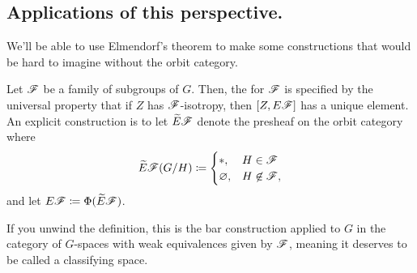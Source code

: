 \subsection*{Applications of this perspective.}
We'll be able to use Elmendorf's theorem to make some constructions that would be hard to imagine without the orbit
category.
\begin{defn}
Let $\mathscr F$ be a family of subgroups of $G$. Then, the  for $\mathscr F$ is specified by the
universal property that if $Z$ has $\mathscr F$-isotropy, then $[Z, E\mathscr F]$ has a unique element. An explicit construction
is to let $\widetilde E\mathscr F$ denote the presheaf on the orbit category where
\[\widetilde E\mathscr F(G/H) \coloneqq
\begin{cases}
	*, &H\in\mathscr F\\
	\varnothing, &H\not\in\mathscr F,
\end{cases}\]
and let $E\mathscr F\coloneqq \Phi(\widetilde E\mathscr F)$.
\end{defn}
If you unwind the definition, this is the bar construction applied to $G$ in the category of $G$-spaces with weak
equivalences given by $\mathscr F$, meaning it deserves to be called a classifying space.

